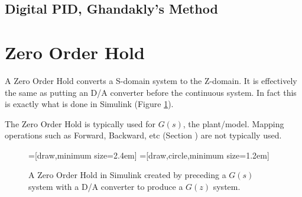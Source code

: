 \documentclass{article}
\newcommand{\sincludepdf}[2][]{
	
}
\begin{document}
\sincludepdf[pages={9},
			pagecommand=\subsubsection*{Example 4}
		]{scan/11221301.pdf}

\subsection{Digital PID, Ghandakly's Method}


\clearpage
\section{Zero Order Hold}
\label{sec:zoh}

A Zero Order Hold converts a S-domain system to the Z-domain.
It is effectively the same as putting an D/A converter before
the continuous system.
In fact this is exactly what is done in Simulink (Figure \ref{fig:simulinkzoh}).

The Zero Order Hold is typically used for $G(s)$, the plant/model.
Mapping operations such as Forward, Backward, etc
(Section \label{sec:mapping}) are not typically used.

\begin{figure}
\begin{center}
=[draw,minimum size=2.4em]
=[draw,circle,minimum size=1.2em]
\end{center}

\caption{A Zero Order Hold in Simulink created by preceding
a $G(s)$ system with a D/A converter to produce a $G(z)$ system.}
\label{fig:simulinkzoh}
\end{figure}
\end{document}

